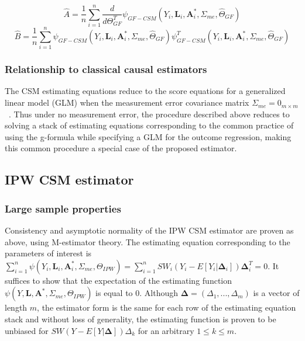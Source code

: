 \documentclass[12pt]{article}
\begin{document}
\begin{equation*}
\hat{A} = \frac{1}{n} \sum_{i=1}^{n} \frac{d}{d\Theta_{GF}^{T}} \psi_{GF-CSM}(Y_{i}, \bm{L}_{i}, \bm{A}^{*}_{i}, \Sigma_{me}, \hat{\Theta}_{GF})
\end{equation*}
\begin{equation*}
\hat{B} = \frac{1}{n} \sum_{i=1}^{n} \psi_{GF-CSM}(Y_{i}, \bm{L}_{i}, \bm{A}^{*}_{i}, \Sigma_{me}, \hat{\Theta}_{GF}) \psi^{T}_{GF-CSM}(Y_{i}, \bm{L}_{i}, \bm{A}^{*}_{i}, \Sigma_{me}, \hat{\Theta}_{GF})
\end{equation*}

\subsubsection{Relationship to classical causal estimators}

The CSM estimating equations reduce to the score equations for a generalized linear model (GLM) when the measurement error covariance matrix $\Sigma_{me} = 0_{m \times m}$~\citep{carroll2006}. Thus under no measurement error, the procedure described above reduces to solving a stack of estimating equations corresponding to the common practice of using the g-formula while specifying a GLM for the outcome regression, making this common procedure a special case of the proposed estimator.

\subsection{IPW CSM estimator}

\subsubsection{Large sample properties}

Consistency and asymptotic normality of the IPW CSM estimator are proven as above, using M-estimator theory. The estimating equation corresponding to the parameters of interest is $\sum_{i=1}^{n} \psi(Y_{i}, \bm{L}_{i}, \bm{A}^{*}_{i}, \Sigma_{me}, \Theta_{IPW}) = \sum_{i=1}^{n} SW_{i}(Y_{i} - E[Y_{i} | \bm{\Delta}_{i}])\bm{\Delta}_{i}^{T} = 0$. It suffices to show that the expectation of the estimating function $\psi(Y, \bm{L}, \bm{A}^{*}, \Sigma_{me}, \Theta_{IPW})$ is equal to 0. Although $\bm{\Delta} = (\Delta_{1}, ..., \Delta_{m})$ is a vector of length $m$, the estimator form is the same for each row of the estimating equation stack and without loss of generality, the estimating function is proven to be unbiased for $SW(Y - E[Y | \bm{\Delta}])\Delta_{k}$ for an arbitrary $1 \leq k \leq m$.
\end{document}
